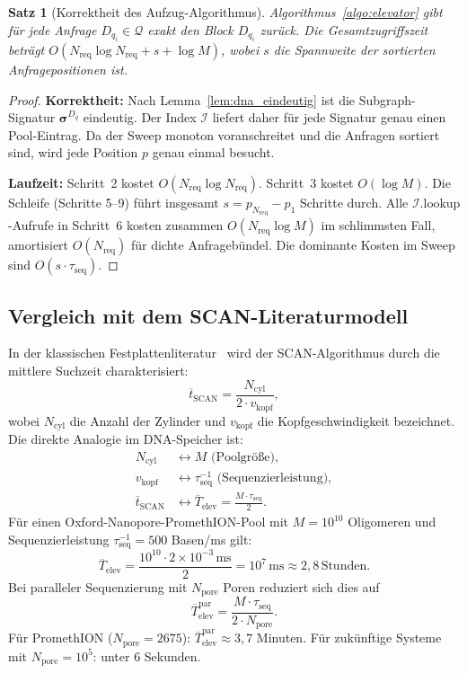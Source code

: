 ﻿\documentclass[a4paper,12pt]{article}
\theoremstyle{definition}
\theoremstyle{plain}
\newtheorem{satz}{Satz}[section]
\begin{document}
\begin{satz}[Korrektheit des Aufzug-Algorithmus]
\label{satz:elevator_korrektheit}
  Algorithmus~\ref{algo:elevator} gibt für jede Anfrage $D_{q_i} \in \mathcal{Q}$
  exakt den Block $D_{q_i}$ zurück.  Die Gesamtzugriffszeit beträgt
  $O(N_{\mathrm{req}} \log N_{\mathrm{req}} + s + \log M)$, wobei
  $s$ die Spannweite der sortierten Anfragepositionen ist.
\end{satz}

\begin{proof}
  \textbf{Korrektheit:} Nach Lemma~\ref{lem:dna_eindeutig} ist die
  Subgraph-Signatur $\boldsymbol{\sigma}^{D_q}$ eindeutig.  Der Index
  $\mathcal{I}$ liefert daher für jede Signatur genau einen Pool-Eintrag.
  Da der Sweep monoton voranschreitet und die Anfragen sortiert sind,
  wird jede Position $p$ genau einmal besucht.

  \textbf{Laufzeit:} Schritt~2 kostet $O(N_{\mathrm{req}} \log N_{\mathrm{req}})$.
  Schritt~3 kostet $O(\log M)$.  Die Schleife (Schritte 5--9) führt
  insgesamt $s = p_{N_{\mathrm{req}}} - p_1$ Schritte durch.  Alle
  $\mathcal{I}.\mathrm{lookup}$-Aufrufe in Schritt~6 kosten zusammen
  $O(N_{\mathrm{req}} \log M)$ im schlimmsten Fall, amortisiert
  $O(N_{\mathrm{req}})$ für dichte Anfragebündel.  Die dominante Kosten
  im Sweep sind $O(s \cdot \tau_{\mathrm{seq}})$. 
\end{proof}

\subsection{Vergleich mit dem SCAN-Literaturmodell}
\label{ssec:elevator_scan}

In der klassischen Festplattenliteratur~\cite{tanenbaum} wird der
SCAN-Algorithmus durch die mittlere Suchzeit charakterisiert:
\[
  \overline{t}_{\mathrm{SCAN}} = \frac{N_{\mathrm{cyl}}}{2 \cdot v_{\mathrm{kopf}}},
\]
wobei $N_{\mathrm{cyl}}$ die Anzahl der Zylinder und $v_{\mathrm{kopf}}$
die Kopfgeschwindigkeit bezeichnet.  Die direkte Analogie im DNA-Speicher
ist:
\begin{align*}
  N_{\mathrm{cyl}}   &\leftrightarrow M \text{ (Poolgröße)}, \\
  v_{\mathrm{kopf}}  &\leftrightarrow \tau_{\mathrm{seq}}^{-1}
                                      \text{ (Sequenzierleistung)}, \\
  \overline{t}_{\mathrm{SCAN}}
    &\leftrightarrow \overline{T}_{\mathrm{elev}}
      = \frac{M \cdot \tau_{\mathrm{seq}}}{2}.
\end{align*}
Für einen Oxford-Nanopore-PromethION-Pool mit
$M = 10^{10}$ Oligomeren und Sequenzierleistung
$\tau_{\mathrm{seq}}^{-1} = 500$ Basen/ms gilt:
\[
  \overline{T}_{\mathrm{elev}}
  = \frac{10^{10} \cdot 2 \times 10^{-3}\,\text{ms}}{2}
  = 10^7\,\text{ms}
  \approx 2{,}8\,\text{Stunden}.
\]
Bei paralleler Sequenzierung mit $N_{\mathrm{pore}}$ Poren reduziert
sich dies auf
\[
  \overline{T}_{\mathrm{elev}}^{\mathrm{par}} = \frac{M \cdot \tau_{\mathrm{seq}}}{2 \cdot N_{\mathrm{pore}}}.
\]
Für PromethION ($N_{\mathrm{pore}} = 2675$):
$\overline{T}_{\mathrm{elev}}^{\mathrm{par}} \approx 3{,}7$ Minuten.
Für zukünftige Systeme mit $N_{\mathrm{pore}} = 10^5$: unter $6$ Sekunden.
\end{document}

